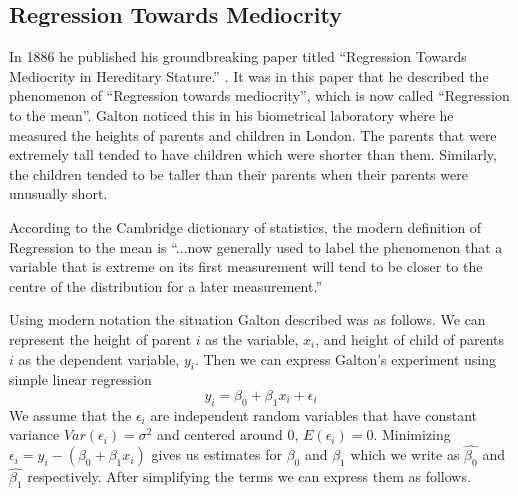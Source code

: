 \documentclass{article}
\begin{document}
\subsection{Regression Towards Mediocrity}
In 1886 he published his groundbreaking paper titled ``Regression Towards Mediocrity in Hereditary Stature.'' \cite{galton_regression}.
It was in this paper that he described the phenomenon of ``Regression towards mediocrity'', which is now called ``Regression to the mean''.
Galton noticed this in his biometrical laboratory where he measured the heights of parents and children in London.
The parents that were extremely tall tended to have children which were shorter than them.
Similarly, the children tended to be taller than their parents when their parents were unusually short.

According to the Cambridge dictionary of statistics, the modern definition of Regression to the mean is ``...now generally used to label the phenomenon that a variable that is extreme on its first measurement will tend to be closer to the centre of the distribution for a later measurement.'' \cite{cambridgestats}

Using modern notation the situation Galton described was as follows.
We can represent the height of parent $i$ as the variable, $x_i$, and height of child of parents $i$ as the dependent variable, $y_i$.
Then we can express Galton's experiment using simple linear regression
$$
y_i = \beta_0 + \beta_1 x_i + \epsilon_i
$$
We assume that the $\epsilon_i$ are independent random variables that have constant variance $Var(\epsilon_i) = \sigma^2$ and centered around 0, $E(\epsilon_i) = 0$.
Minimizing $\epsilon_i = y_i - (\beta_0 + \beta_1 x_i)$ gives us estimates for $\beta_0$ and $\beta_1$ which we write as $\hat{\beta_0}$ and $\hat{\beta_1}$ respectively.
After simplifying the terms we can express them as follows.
\end{document}
